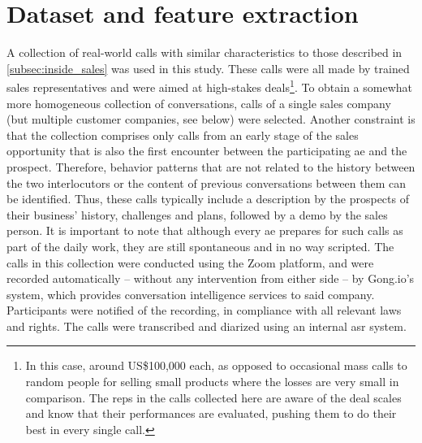 \section{Dataset and feature extraction}
\label{sec:dataset_calls}

A collection of real-world calls with similar characteristics to those described in \cref{subsec:inside_sales} was used in this study.
These calls were all made by trained sales representatives and were aimed at high-stakes deals\footnote{In this case, around US\$100,000 each, as opposed to occasional mass calls to random people for selling small products where the losses are very small in comparison.
The reps in the calls collected here are aware of the deal scales and know that their performances are evaluated, pushing them to do their best in every single call.}.
To obtain a somewhat more homogeneous collection of conversations, calls of a single sales company (but multiple customer companies, see below) were selected.
Another constraint is that the collection comprises only calls from an early stage of the sales opportunity that is also the first encounter between the participating \ac{ae} and the prospect.
Therefore, behavior patterns that are not related to the history between the two interlocutors or the content of previous conversations between them can be identified.
Thus, these calls typically include a description by the prospects of their business' history, challenges and plans, followed by a demo by the sales person.
It is important to note that although every \ac{ae} prepares for such calls as part of the daily work, they are still spontaneous and in no way scripted.
The calls in this collection were conducted using the Zoom platform, and were recorded automatically -- without any intervention from either side -- by Gong.io's system, which provides conversation intelligence services to said company.
Participants were notified of the recording, in compliance with all relevant laws and rights.
The calls were transcribed and diarized using an internal \ac{asr} system.

